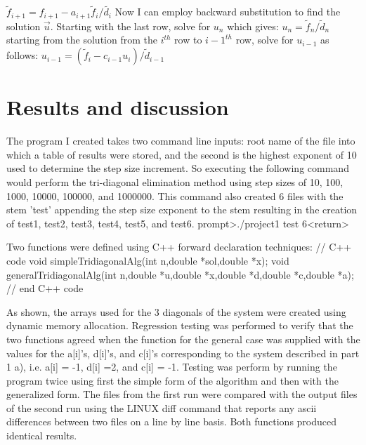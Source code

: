 \documentclass[11pt, oneside]{article}   	%
\begin{document}
\newline
$\tilde{f}_{i+1} = f_{i+1} - a_{i+1}\tilde{f}_i/\tilde{d_i}$\newline
\newline
Now I can employ backward substitution to find the solution $\vec{u}$. Starting with the last row, solve for $u_n$ which gives:\newline
\newline
$u_n = \tilde{f}_n/\tilde{d}_n$\newline
\newline
starting from the solution from the $i^{th}$  row to  ${i-1}^{th}$ row, solve for $u_{i-1}$ as follows:\newline
\newline
$u_{i-1}=(\tilde{f}_i -c_{i-1}u_i)/\tilde{d}_{i-1}$\newline
\newline
\section{Results and discussion}
The program I created takes two command line inputs: root name of the file into which a table of results were stored, and the second is the highest exponent of 10 used to determine the step size increment. So executing the following command would perform the tri-diagonal elimination method using step sizes of 10, 100, 1000, 10000, 100000, and 1000000. This command also created 6 files with the stem 'test' appending  the step size exponent to the stem resulting in the creation of test1, test2, test3, test4, test5, and test6. 
prompt>./project1 test 6<return>

Two functions were defined using C++ forward declaration techniques:\newline
// C++ code\newline
void simpleTridiagonalAlg(int n,double *sol,double *x);\newline
void generalTridiagonalAlg(int n,double *u,double *x,double *d,double *c,double *a);\newline
// end C++ code\newline

As shown, the arrays used for the 3 diagonals of the system were created using dynamic memory allocation. Regression testing was performed to verify that the two functions agreed when the function for the general case was supplied  with the values for the a[i]'s, d[i]'s, and c[i]'s corresponding to the system described in part 1 a), i.e. a[i] = -1, d[i] =2, and c[i] = -1. Testing was perform by running the program twice using first the simple form of the algorithm and then with the generalized form. The files from the first run were compared with the output files of the second run using the LINUX diff command that reports any ascii differences between two files on a line by line basis. Both functions produced identical results.
\end{document}
